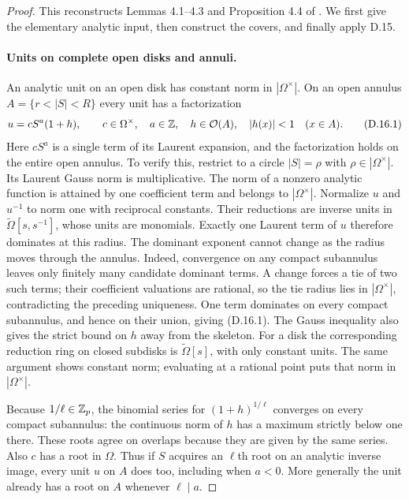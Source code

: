 \begin{proof}
This reconstructs Lemmas 4.1--4.3 and Proposition 4.4 of
\citet{D_OpenAI2026}. We first give the elementary analytic input,
then construct the covers, and finally apply D.15.

\paragraph{Units on complete open disks and annuli.}
An analytic unit on an open disk has constant norm in
$|\Omega^\times|$. On an open annulus $A=\{r<|S|<R\}$ every unit
has a factorization
\[
 u=cS^a(1+h),\qquad c\in\Omega^\times,\quad a\in\mathbb Z,
       \quad h\in\mathcal O(A),\quad |h(x)|<1\quad(x\in A).
 \tag{D.16.1}
\]
Here $cS^a$ is a single term of its Laurent expansion, and the
factorization holds on the entire open annulus.
To verify this, restrict to a circle $|S|=\rho$ with
$\rho\in|\Omega^\times|$. Its Laurent Gauss norm is
multiplicative. The norm of a nonzero analytic function is attained
by one coefficient term and belongs to $|\Omega^\times|$.
Normalize $u$ and $u^{-1}$ to norm one with reciprocal constants.
Their reductions are inverse units in
$\widetilde\Omega[s,s^{-1}]$, whose units are monomials.
Exactly one Laurent term of $u$ therefore dominates at this radius.
The dominant exponent cannot change as the radius moves through
the annulus. Indeed, convergence on any compact subannulus leaves
only finitely many candidate dominant terms. A change forces a tie
of two such terms; their coefficient valuations are rational, so
the tie radius lies in $|\Omega^\times|$, contradicting the
preceding uniqueness. One term dominates on every compact
subannulus, and hence on their union, giving (D.16.1).
The Gauss inequality also gives the strict bound on $h$ away from
the skeleton. For a disk the corresponding reduction ring on
closed subdisks is $\widetilde\Omega[s]$, with only constant
units. The same argument shows constant norm; evaluating at a
rational point puts that norm in $|\Omega^\times|$.

Because $1/\ell\in\mathbb Z_p$, the binomial series for
$(1+h)^{1/\ell}$ converges on every compact subannulus: the
continuous norm of $h$ has a maximum strictly below one there.
These roots agree on overlaps because they are given by the same
series. Also $c$ has a root in $\Omega$. Thus if $S$ acquires an
$\ell$th root on an analytic inverse image, every unit $u$ on $A$
does too, including when $a<0$. More generally the unit already
has a root on $A$ whenever $\ell\mid a$.


\end{proof}
